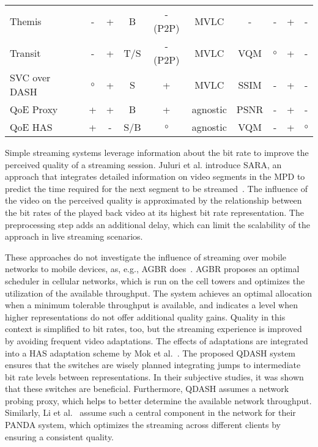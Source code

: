 \begin{table}
\begin{tabular}{lccccccccc}
Themis~\cite{Medjiah2014}& - & +  & B & - (P2P) & MVLC & -& - & +& -\\
Transit~\cite{Wichtlhuber2014} & - & +  & T/S & - (P2P) & MVLC  & VQM & $\circ$ & + & - \\
SVC over DASH~\cite{Hossfeld2015a}& $\circ$ & + & S & + & MVLC & SSIM& - & + & - \\
QoE Proxy~\cite{Essaili2013} & + & + & B  & + &  agnostic  & PSNR & - & + & -\\
QoE HAS~\cite{Devlic2015} & + & - & S/B & $\circ$ &  agnostic  & VQM & - & + & $\circ$ \\ 
\bottomrule[1.5pt]
\end{tabular} 
\label{tab:250_Related_Work}
 \end{table}
Simple streaming systems leverage information about the bit rate to improve the perceived quality of a streaming session.
Juluri et al. introduce \ac{SARA}, an approach that integrates detailed information on video segments in the \ac{MPD} to predict the time required for the next segment to be streamed~\cite{Juluri2015}. 
The influence of the video on the perceived quality is approximated by the relationship between the bit rates of the played back video at its highest bit rate representation.
The preprocessing step adds an additional delay, which can limit the scalability of the approach in live streaming scenarios.

These approaches do not investigate the influence of streaming over mobile networks to mobile devices, as, e.g., \ac{AGBR} does~\cite{DeVleeschauwer2013}.
\ac{AGBR} proposes an optimal scheduler in cellular networks, which is run on the cell towers and optimizes the utilization of the available throughput.
The system achieves an optimal allocation when a minimum tolerable throughput is available, and indicates a level when higher representations do not offer additional quality gains.
Quality in this context is simplified to bit rates, too, but the streaming experience is improved by avoiding frequent video adaptations.
The effects of adaptations are integrated into a \ac{HAS} adaptation scheme by Mok et al.~\cite{Mok2012}. 
The proposed \ac{QDASH} system ensures that the switches are wisely planned integrating jumps to intermediate bit rate levels between representations.
In their subjective studies, it was shown that these switches are beneficial.
Furthermore, \ac{QDASH} assumes a network probing proxy, which helps to better determine the available network throughput.
Similarly, Li et al.~\cite{Li2014} assume such a central component in the network for their \ac{PANDA} system, which optimizes the streaming across different clients by ensuring a consistent quality.
 
